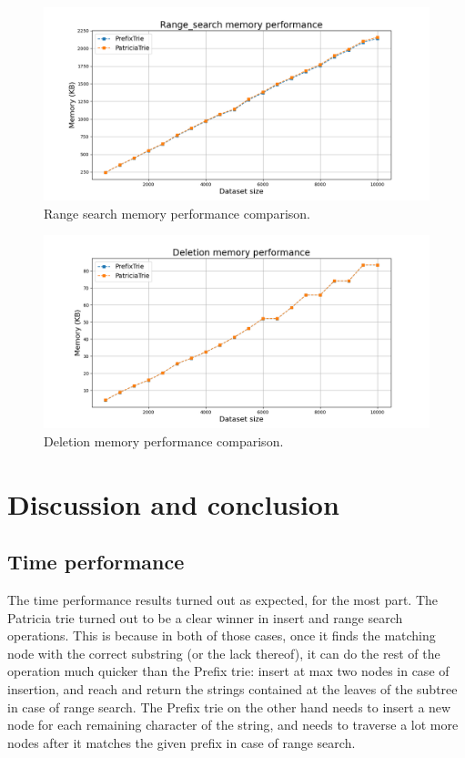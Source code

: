 \documentclass[essay]{fer}
\begin{document}
\begin{figure}[H]
  \centering
  \includegraphics[width=1.00\textwidth]{Figures/range_search_memory_performance.png}
  \caption{Range search memory performance comparison.}
  \label{fig:range_search_memory}
\end{figure}

\begin{figure}[H]
  \centering
  \includegraphics[width=1.00\textwidth]{Figures/deletion_memory_performance.png}
  \caption{Deletion memory performance comparison.}
  \label{fig:deletion_memory}
\end{figure}


\chapter{Discussion and conclusion}
\label{chptr:discussion_and_conclusion}

\section{Time performance}
\label{sec:time_performance_discussion}

The time performance results turned out as expected, for the most part.
The Patricia trie turned out to be a clear winner in insert and range search operations.
This is because in both of those cases, once it finds the matching node with the correct substring (or the lack thereof),
it can do the rest of the operation much quicker than the Prefix trie: insert at max two nodes in case of insertion,
and reach and return the strings contained at the leaves of the subtree in case of range search.
The Prefix trie on the other hand needs to insert a new node for each remaining character of the string,
and needs to traverse a lot more nodes after it matches the given prefix in case of range search.
\end{document}
